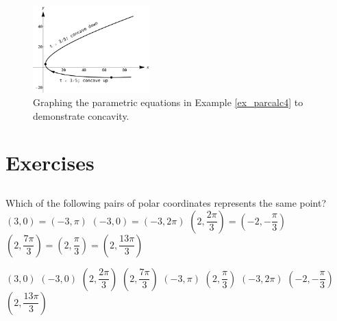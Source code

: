 \begin{example}
		\begin{figure}[H]
	\begin{center}
			\includegraphics[width=0.4\textwidth]{fig_parametric_22}
	\caption{Graphing the parametric equations in Example \ref{ex_parcalc4} to demonstrate concavity.}
	\label{fig_parametric_22}
	\end{center}
\end{figure}


\end{example}




\newpage
\section{Exercises}

\renewcommand{\ExerciseListName}{Assignement}

\subsection*{}
\begin{Exercise}[difficulty = 1] Which of the following pairs of polar coordinates represents the same point? 
			\Question $(3,0) = (-3,\pi)$
			\Question $(-3,0) = (-3,2\pi)$
			\Question $\left(2, \dfrac{2 \pi}{3} \right) = \left(-2, -\dfrac{\pi}{3} \right)$
			\Question $\left(2, \dfrac{7 \pi}{3} \right)=\left(2, \dfrac{\pi}{3} \right)=\left(2, \dfrac{13\pi}{3} \right)$
			\EndCurrentQuestion

\end{Exercise}

\begin{Answer}\phantom{}
		\begin{multicols}{2}
			\Question $(3,0)$
			\Question $(-3,0)$
			\Question $\left(2, \dfrac{2 \pi}{3} \right)$
			\Question  $\left(2, \dfrac{7 \pi}{3} \right)$
			\Question  $(-3, \pi)$
			\Question  $\left(2, \dfrac{\pi}{3}\right)$
			\Question  $(-3, 2\pi)$ 
			\Question  $\left(-2, -\dfrac{\pi}{3} 			\right)$
			\Question  $\left(2, \dfrac{13\pi}{3} \right)$
			\EndCurrentQuestion
		\end{multicols}
\end{Answer}

